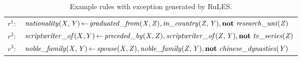 

\begin{table}[t]
\centering
\footnotesize
\begin{tabular}{|cl|}
	\hline
$r^1{:}$ & $\mathit{nationality(X{,}\, Y)}\, {\leftarrow}\, \mathit{graduated\_from(X{,}\, Z)}{,}\, \mathit{in\_country(Z{,}\, Y)},
	\textbf{not}\ \mathit{research\_uni(Z)}$\\
$r^2{:}$ & $\mathit{scriptwriter\_of}(X{,}\, Y)\, {\leftarrow}\, \mathit{preceded\_by(X{,}\, Z)}{,}\, \mathit{scriptwriter\_of(Z{,}\, Y)},
\textbf{not}\ \mathit{tv\_series(Z)}$\\
$r^3{:}$ &$\mi{noble\_family(X{,}\, Y)}\, {\leftarrow}\, \mi{ spouse(X{,}\, Z)}{,}\, \mi{noble\_family(Z{,}\, Y)}{,}\,  \textbf{not}\ \mi{ chinese\_dynasties(Y)}$\\

	\hline
\end{tabular}
\caption{Example rules with exception generated by RuLES.}
\vspace*{-3mm}
\label{figure:examples}
\end{table}
